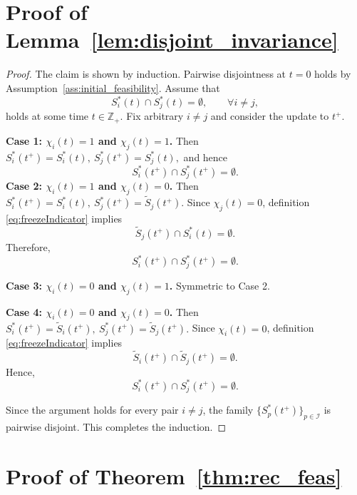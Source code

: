 \documentclass[twocolumn]{autart}
\begin{document}
\section{Proof of Lemma~\ref{lem:disjoint_invariance}}
\begin{proof}
The claim is shown by induction.
Pairwise disjointness at $t=0$ holds by Assumption~\ref{ass:initial_feasibility}.
Assume that
\[
S_i^\ast(t)\cap S_j^\ast(t)=\emptyset,
\qquad \forall i\neq j,
\]
holds at some time $t\in\mathbb Z_+$.
Fix arbitrary $i\neq j$ and consider the update to $t^+$.

\smallskip
\noindent\textbf{Case 1: $\chi_i(t)=1$ and $\chi_j(t)=1$.}
Then
\(
S_i^\ast(t^+)=S_i^\ast(t),
\ 
S_j^\ast(t^+)=S_j^\ast(t),
\)
and hence
\[
S_i^\ast(t^+)\cap S_j^\ast(t^+)=\emptyset.
\]
\smallskip
\noindent\textbf{Case 2: $\chi_i(t)=1$ and $\chi_j(t)=0$.}
Then
\(
S_i^\ast(t^+)=S_i^\ast(t),
\
S_j^\ast(t^+)=\tilde S_j(t^+).
\)
Since $\chi_j(t)=0$, definition \eqref{eq:freezeIndicator} implies
\[
\tilde S_j(t^+)\cap S_i^\ast(t)=\emptyset.
\]
Therefore,
\[
S_i^\ast(t^+)\cap S_j^\ast(t^+)=\emptyset.
\]

\smallskip
\noindent\textbf{Case 3: $\chi_i(t)=0$ and $\chi_j(t)=1$.}
Symmetric to Case 2.

\smallskip
\noindent\textbf{Case 4: $\chi_i(t)=0$ and $\chi_j(t)=0$.}
Then
\(
S_i^\ast(t^+)=\tilde S_i(t^+),
\
S_j^\ast(t^+)=\tilde S_j(t^+).
\)
Since $\chi_i(t)=0$, definition \eqref{eq:freezeIndicator} implies
\[
\tilde S_i(t^+)\cap \tilde S_j(t^+)=\emptyset.
\]
Hence,
\[
S_i^\ast(t^+)\cap S_j^\ast(t^+)=\emptyset.
\]

Since the argument holds for every pair $i\neq j$, the family
$\{S_p^\ast(t^+)\}_{p\in\mathcal I}$ is pairwise disjoint.
This completes the induction.
\end{proof}

\section{Proof of Theorem~\ref{thm:rec_feas}}
\end{document}
